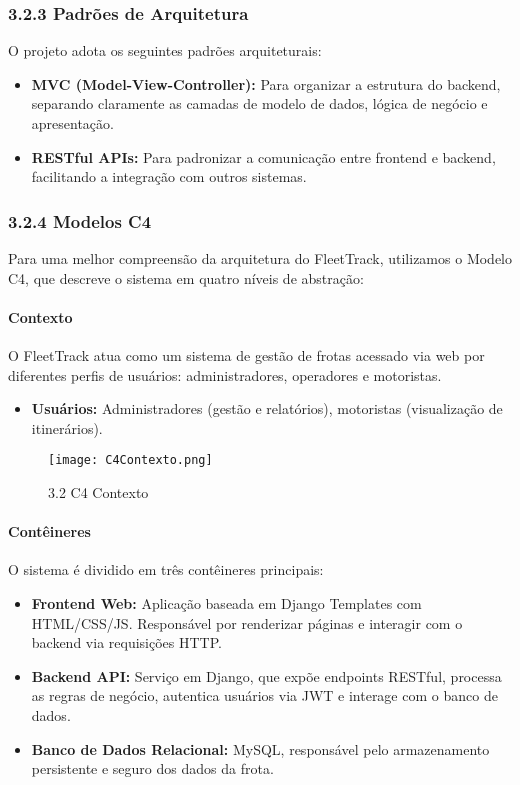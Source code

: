 \documentclass[12pt]{article}
\begin{document}
\subsubsection*{3.2.3 Padrões de Arquitetura}

O projeto adota os seguintes padrões arquiteturais:

\begin{itemize}
    \item \textbf{MVC (Model-View-Controller):} Para organizar a estrutura do backend, separando claramente as camadas de modelo de dados, lógica de negócio e apresentação.
    \item \textbf{RESTful APIs:} Para padronizar a comunicação entre frontend e backend, facilitando a integração com outros sistemas.
\end{itemize}

\subsubsection*{3.2.4 Modelos C4}

Para uma melhor compreensão da arquitetura do FleetTrack, utilizamos o Modelo C4, que descreve o sistema em quatro níveis de abstração:

\paragraph{Contexto}

O FleetTrack atua como um sistema de gestão de frotas acessado via web por diferentes perfis de usuários: administradores, operadores e motoristas.

\begin{itemize}
    \item \textbf{Usuários:} Administradores (gestão e relatórios), motoristas (visualização de itinerários).
\end{itemize}
\begin{figure}[!ht]
    \centering
    \texttt{[image: C4Contexto.png]}
    \caption{3.2 C4 Contexto}
    \label{fig::C4 Contexto}
\end{figure}
 \newpage
 
\paragraph{Contêineres}
O sistema é dividido em três contêineres principais:

\begin{itemize}
    \item \textbf{Frontend Web:} Aplicação baseada em Django Templates com HTML/CSS/JS. Responsável por renderizar páginas e interagir com o backend via requisições HTTP.
    \item \textbf{Backend API:} Serviço em Django, que expõe endpoints RESTful, processa as regras de negócio, autentica usuários via JWT e interage com o banco de dados.
    \item \textbf{Banco de Dados Relacional:} MySQL, responsável pelo armazenamento persistente e seguro dos dados da frota.
\end{itemize}
\end{document}
